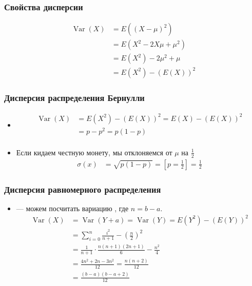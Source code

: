\documentclass[hyperref=unicode,graphics=pdflatex,13pt,xcolor={usenames,dvipsnames}]{beamer}
\renewcommand\emph[1]{{\color{blue}{#1}}}
\newcommand\pitem{\pause\item}
\DeclareMathOperator{\Bern}{Bern}
\DeclareMathOperator{\Var}{Var}
\begin{document}
\begin{frame}
  \frametitle{Свойства дисперсии}
  \begin{center}
  \end{center}
  
  \pause

  \begin{align*}
    \Var(X) &= E\left((X - \mu)^2\right) \\
    &= E\left(X^2 - 2X\mu + \mu^2\right) \\
    &= E(X^2) - 2\mu^2 + \mu \\
    &= E(X^2) - (E(X))^2 
  \end{align*}
\end{frame}

\begin{frame}
  \frametitle{Дисперсия распределения Бернулли}
  \begin{itemize}
    \item \emph{$X \sim \Bern(p)$}
    \begin{align*}
      \Var(X) &= E(X^2) - (E(X))^2 = E(X) - (E(X))^2 \\
              &= p - p^2 = p(1 - p) \\
    \end{align*}
    \pitem Если кидаем честную монету, мы \emph{всегда} отклоняемся от $\mu$ на $\frac{1}{2}$
    \begin{align*}
      \sigma(x) &= \sqrt{p(1 - p)} = \left[p = \frac{1}{2}\right] = \frac{1}{2}
    \end{align*} 
  \end{itemize}
\end{frame}

\begin{frame}
  \frametitle{Дисперсия равномерного распределения}

  \begin{itemize}
    \item \emph{$X \sim U(a, b)$} --- можем посчитать вариацию \emph{$Y = X - a \sim U(0, n)$}, где $n = b - a$. 
    \begin{align*}
      \Var(X) &= \Var(Y + a) = \Var(Y) = E(Y^2) - (E(Y))^2 \\
              &= \sum_{i = 0}^n \frac{i^2}{n + 1} - \left(\frac{n}{2}\right)^2 \\
              &= \frac{1}{n + 1} \cdot \frac{n(n + 1)(2n + 1)}{6} - \frac{n^2}{4} \\
              &= \frac{4n^2 + 2n - 3n^2}{12} = \frac{n(n + 2)}{12} \\
              &= \frac{(b - a)(b - a + 2)}{12}
    \end{align*}
  \end{itemize}
  

\end{frame}
\end{document}
